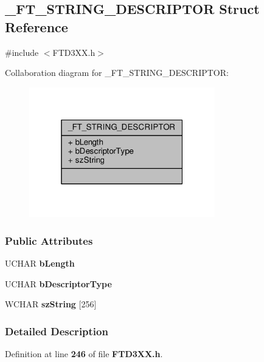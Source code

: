 \subsection{\+\_\+\+F\+T\+\_\+\+S\+T\+R\+I\+N\+G\+\_\+\+D\+E\+S\+C\+R\+I\+P\+T\+OR Struct Reference}
\label{struct__FT__STRING__DESCRIPTOR}


{\ttfamily \#include $<$F\+T\+D3\+X\+X.\+h$>$}



Collaboration diagram for \+\_\+\+F\+T\+\_\+\+S\+T\+R\+I\+N\+G\+\_\+\+D\+E\+S\+C\+R\+I\+P\+T\+OR\+:
\nopagebreak
\begin{figure}[H]
\begin{center}
\leavevmode
\includegraphics[width=229pt]{d7/d3d/struct__FT__STRING__DESCRIPTOR__coll__graph}
\end{center}
\end{figure}
\subsubsection*{Public Attributes}
\begin{DoxyCompactItemize}
\item 
U\+C\+H\+AR {\bf b\+Length}
\item 
U\+C\+H\+AR {\bf b\+Descriptor\+Type}
\item 
W\+C\+H\+AR {\bf sz\+String} [256]
\end{DoxyCompactItemize}


\subsubsection{Detailed Description}


Definition at line {\bf 246} of file {\bf F\+T\+D3\+X\+X.\+h}.



